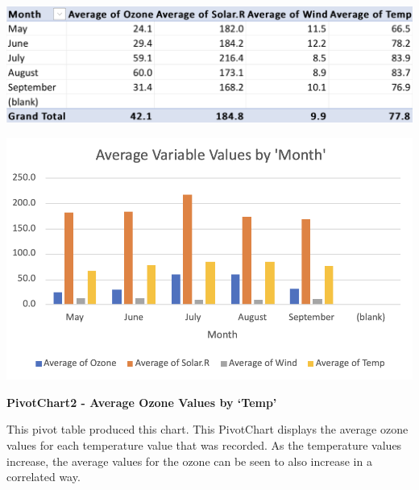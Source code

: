 \documentclass[
  letterpaper,
  DIV=11,
  numbers=noendperiod]{scrreprt}
\begin{document}
\includegraphics{PivotTable1_AverageVariableValues_Pena.png}

\includegraphics{PivotChart1_AverageVariableValues_Pena.png}

\textbf{PivotChart2 - Average Ozone Values by `Temp'}

This pivot table produced this chart. This PivotChart displays the
average ozone values for each temperature value that was recorded. As
the temperature values increase, the average values for the ozone can be
seen to also increase in a correlated way.
\end{document}
